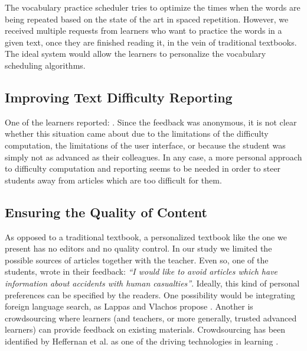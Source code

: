 The vocabulary practice scheduler tries to optimize the times when the words are being repeated based on the state of the art in spaced repetition. However, we received multiple requests from learners who want to practice the words in a given text, once they are finished reading it, in the vein of traditional textbooks. The ideal system would allow the learners to personalize the vocabulary scheduling algorithms. 


\subsection{Improving Text Difficulty Reporting}
One of the learners reported: . Since the feedback was anonymous, it is not clear whether this situation came about due to the limitations of the difficulty computation, the limitations of the user interface, or because the student was simply not as advanced as their colleagues. In any case, a more personal approach to difficulty computation and reporting seems to be needed in order to steer students away from articles which are too difficult for them. 


\subsection{Ensuring the Quality of Content}
As opposed to a traditional textbook, a personalized textbook like the one we present has no editors and no quality control. In our study we limited the possible sources of articles together with the teacher. Even so, one of the students, wrote in their feedback: {\em ``I would like to avoid articles which have information about accidents with human casualties''}. Ideally, this kind of personal preferences can be specified by the readers. One possibility would be integrating  foreign language search, as Lappas and Vlachos propose \cite{Lapp12-NonNative}. Another is crowdsourcing where learners (and teachers, or more generally, trusted advanced learners) can provide feedback on existing materials. Crowdsourcing has been identified by Heffernan et al. as one of the driving technologies in learning \cite{Heff16-crowdsourcing}. 

